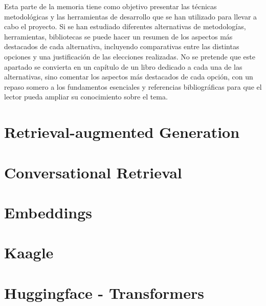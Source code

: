 
Esta parte de la memoria tiene como objetivo presentar las técnicas metodológicas y las herramientas de desarrollo que se han utilizado para llevar a cabo el proyecto. Si se han estudiado diferentes alternativas de metodologías, herramientas, bibliotecas se puede hacer un resumen de los aspectos más destacados de cada alternativa, incluyendo comparativas entre las distintas opciones y una justificación de las elecciones realizadas. 
No se pretende que este apartado se convierta en un capítulo de un libro dedicado a cada una de las alternativas, sino comentar los aspectos más destacados de cada opción, con un repaso somero a los fundamentos esenciales y referencias bibliográficas para que el lector pueda ampliar su conocimiento sobre el tema.


\section{Retrieval-augmented Generation}

\section{Conversational Retrieval}

\section{Embeddings}

\section{Kaagle}

\section{Huggingface - Transformers}


